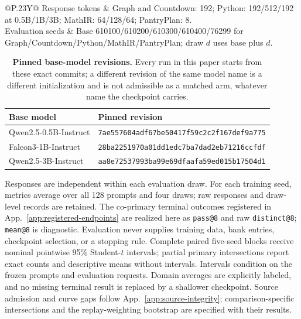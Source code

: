 \documentclass{article}
\newcommand{\1}{\mathbf 1}
\theoremstyle{remark}
\theoremstyle{definition}
\theoremstyle{plain}
\begin{document}
\begin{table}[!htbp]
\begin{tabularx}{\linewidth}{@{}P{.23\linewidth}Y@{}}
    Response tokens & Graph and Countdown: 192; Python: 192/512/192
      at 0.5B/1B/3B; MathIR: 64/128/64; PantryPlan: 8. \\
    Evaluation seeds & Base 610100/610200/610300/610400/76299 for
      Graph/Countdown/Python/MathIR/PantryPlan; draw $d$ uses base plus $d$. \\
    \bottomrule
  \end{tabularx}
\end{table}

\begin{table}[!htbp]
\centering
\caption{\textbf{Pinned base-model revisions.} Every run in this paper starts
from these exact commits; a different revision of the same model name is a
different initialization and is not admissible as a matched arm, whatever
name the checkpoint carries.}
\label{tab:pinned-revisions}
\small
\begin{tabular}{@{}ll@{}}
\toprule
\textbf{Base model} & \textbf{Pinned revision} \\
\midrule
Qwen2.5-0.5B-Instruct & {\scriptsize\texttt{7ae557604adf67be50417f59c2c2f167def9a775}} \\
Falcon3-1B-Instruct & {\scriptsize\texttt{28ba2251970a01dd1edc7ba7dad2eb71216ccfdf}} \\
Qwen2.5-3B-Instruct & {\scriptsize\texttt{aa8e72537993ba99e69dfaafa59ed015b17504d1}} \\
\bottomrule
\end{tabular}
\end{table}

Responses are independent within each evaluation draw. For each training
seed, metrics average over all 128 prompts and four draws; raw responses
and draw-level records are retained. The co-primary terminal outcomes
registered in App.~\ref{app:registered-endpoints} are realized here as
\texttt{pass@8} and raw \texttt{distinct@8}; \texttt{mean@8} is diagnostic.
Evaluation never supplies training data, bank entries, checkpoint selection,
or a stopping rule. Complete paired five-seed blocks receive nominal
pointwise 95\% Student-$t$ intervals; partial primary intersections report
exact counts and descriptive means without intervals. Intervals condition
on the frozen prompts and evaluation requests. Domain averages are
explicitly labeled, and no missing terminal result is replaced by a
shallower checkpoint. Source admission and curve gaps follow
App.~\ref{app:source-integrity}; comparison-specific intersections and
the replay-weighting bootstrap are specified with their results.
\end{document}
